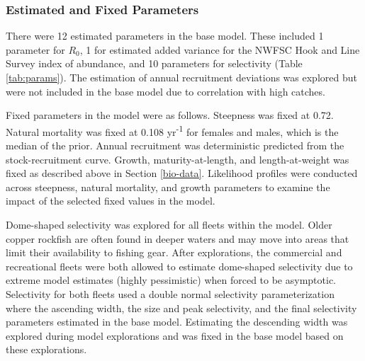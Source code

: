 \documentclass[11pt,
  english,
  a4paper,
]{article}
\begin{document}
\leavevmode\tagmcend\tagstructend\par


\hypertarget{estimated-and-fixed-parameters}{%
\subsubsection{Estimated and Fixed Parameters}\label{estimated-and-fixed-parameters}}

\leavevmode\tagmcend\tagstructend


There were 12 estimated parameters in the base model. These included 1 parameter for {\(R_0\)\leavevmode\tagmcend\tagstructend}, 1 for estimated added variance for the NWFSC Hook and Line Survey index of abundance, and 10 parameters for selectivity (Table \ref{tab:params}). The estimation of annual recruitment deviations was explored but were not included in the base model due to correlation with high catches.

\leavevmode\tagmcend\tagstructend\par


Fixed parameters in the model were as follows. Steepness was fixed at 0.72. Natural mortality was fixed at 0.108 yr\textsuperscript{-1} for females and males, which is the median of the prior. Annual recruitment was deterministic predicted from the stock-recruitment curve. Growth, maturity-at-length, and length-at-weight was fixed as described above in Section \ref{bio-data}. Likelihood profiles were conducted across steepness, natural mortality, and growth parameters to examine the impact of the selected fixed values in the model.

\leavevmode\tagmcend\tagstructend\par


Dome-shaped selectivity was explored for all fleets within the model. Older copper rockfish are often found in deeper waters and may move into areas that limit their availability to fishing gear. After explorations, the commercial and recreational fleets were both allowed to estimate dome-shaped selectivity due to extreme model estimates (highly pessimistic) when forced to be asymptotic. Selectivity for both fleets used a double normal selectivity parameterization where the ascending width, the size and peak selectivity, and the final selectivity parameters estimated in the base model. Estimating the descending width was explored during model explorations and was fixed in the base model based on these explorations.
\end{document}
